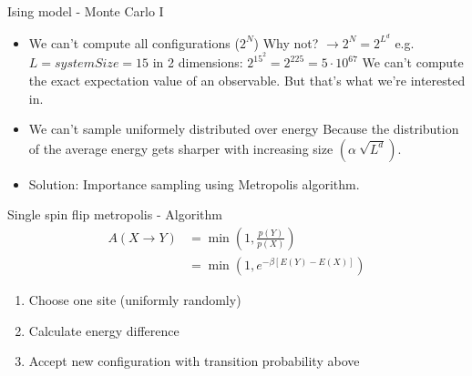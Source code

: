 \documentclass[]{beamer}
\begin{document}
\begin{frame}{Ising model - Monte Carlo I}
\begin{itemize}
\item<2-> We can't compute all configurations (\(2^N\))
	 {Why not? \( \rightarrow 2^N = 2^{L^d} \) e.g. \( L = systemSize = 15 \) in 2 dimensions: \(2^{15^2} = 2^{225} = 5 \cdot 10^{67}\)}
	 {We can't compute the exact expectation value of an observable. But that's what we're interested in.}
\item<3-> We can't sample uniformely distributed over energy \def\svgwidth{12em} 
	 {Because the distribution of the average energy gets sharper with increasing size \(\left(\alpha \ \sqrt{L^d}\right)\).}
\item<4-> Solution: Importance sampling using Metropolis algorithm.
\end{itemize}
\end{frame}

\begin{frame}{Single spin flip metropolis - Algorithm}
\pause
\begin{align*}
A(X \rightarrow Y) &= \min \left( 1, \frac{p(Y)}{p(X)} \right) \\ 
&= \min \left( 1, e^{- \beta \left[ E(Y)-E(X) \right] } \right)
\end{align*}
\begin{enumerate}
\item Choose one site (uniformly randomly)
\item Calculate energy difference
\item Accept new configuration with transition probability above
\end{enumerate}
\end{frame}
\end{document}
